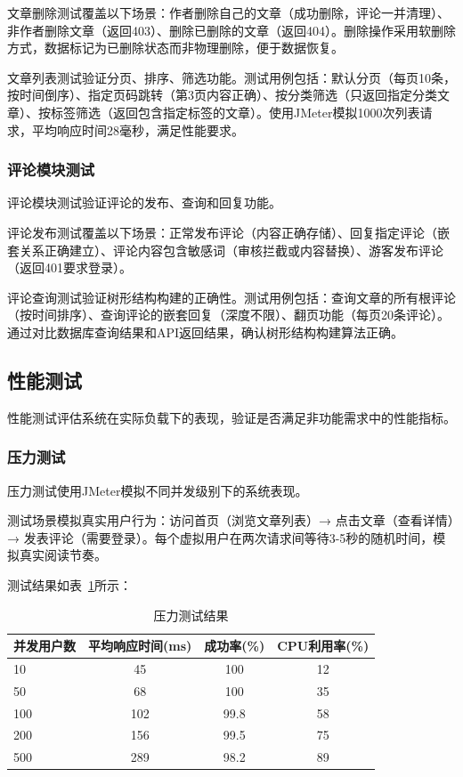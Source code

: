 \documentclass[UTF8,AutoFakeBold=1,AutoFakeSlant,zihao=-4]{SCAU}
\begin{document}
 文章删除测试覆盖以下场景：作者删除自己的文章（成功删除，评论一并清理）、非作者删除文章（返回403）、删除已删除的文章（返回404）。删除操作采用软删除方式，数据标记为已删除状态而非物理删除，便于数据恢复。

 文章列表测试验证分页、排序、筛选功能。测试用例包括：默认分页（每页10条，按时间倒序）、指定页码跳转（第3页内容正确）、按分类筛选（只返回指定分类文章）、按标签筛选（返回包含指定标签的文章）。使用JMeter模拟1000次列表请求，平均响应时间28毫秒，满足性能要求。

 \subsubsection{评论模块测试}

 评论模块测试验证评论的发布、查询和回复功能。

 评论发布测试覆盖以下场景：正常发布评论（内容正确存储）、回复指定评论（嵌套关系正确建立）、评论内容包含敏感词（审核拦截或内容替换）、游客发布评论（返回401要求登录）。

 评论查询测试验证树形结构构建的正确性。测试用例包括：查询文章的所有根评论（按时间排序）、查询评论的嵌套回复（深度不限）、翻页功能（每页20条评论）。通过对比数据库查询结果和API返回结果，确认树形结构构建算法正确。

 \subsection{性能测试}

 性能测试评估系统在实际负载下的表现，验证是否满足非功能需求中的性能指标。

 \subsubsection{压力测试}

 压力测试使用JMeter模拟不同并发级别下的系统表现。

 测试场景模拟真实用户行为：访问首页（浏览文章列表）→ 点击文章（查看详情）→ 发表评论（需要登录）。每个虚拟用户在两次请求间等待3-5秒的随机时间，模拟真实阅读节奏。

 测试结果如表~\ref{tab:stress-test}所示：

 \begin{table}[h]
   \centering
   \caption{压力测试结果}
   \label{tab:stress-test}
   \begin{tabular}{lccc}
     \toprule
     \textbf{并发用户数} & \textbf{平均响应时间(ms)} & \textbf{成功率(\%)} & \textbf{CPU利用率(\%)} \\
     \midrule
     10 & 45 & 100 & 12 \\
     50 & 68 & 100 & 35 \\
     100 & 102 & 99.8 & 58 \\
     200 & 156 & 99.5 & 75 \\
     500 & 289 & 98.2 & 89 \\
     \bottomrule
   \end{tabular}
 \end{table}
\end{document}
